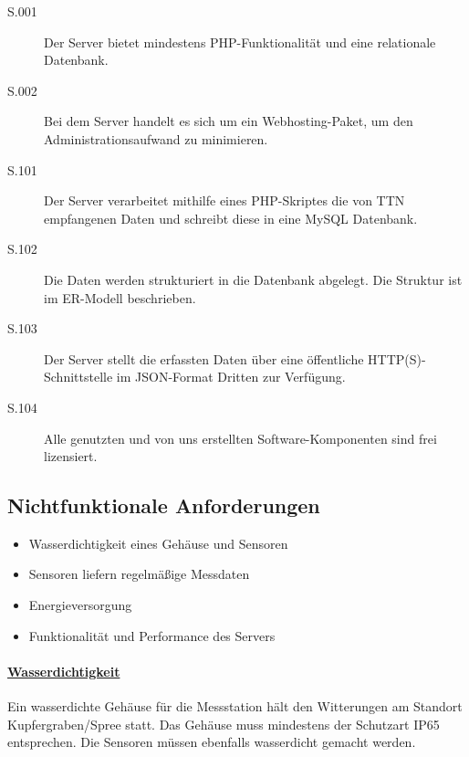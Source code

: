\begin{description}
	\item[S.001]
		Der Server bietet mindestens PHP-Funktionalität und eine relationale Datenbank.

	\item[S.002]
		Bei dem Server handelt es sich um ein Webhosting-Paket, um den
		Administrationsaufwand zu minimieren.
\end{description}

\begin{description}
	\item[S.101]
		Der Server verarbeitet mithilfe eines PHP-Skriptes die von TTN empfangenen
		Daten und schreibt diese in eine MySQL Datenbank.

	\item[S.102]
		Die Daten werden strukturiert in die Datenbank abgelegt. Die Struktur ist im
		ER-Modell beschrieben.

	\item[S.103]
		Der Server stellt die erfassten Daten über eine öffentliche HTTP(S)-Schnittstelle
		im JSON-Format Dritten zur Verfügung.

	\item[S.104]
		Alle genutzten und von uns erstellten Software-Komponenten sind frei lizensiert.
\end{description}


\subsection{Nichtfunktionale Anforderungen}


\begin{itemize}
	\item Wasserdichtigkeit eines Gehäuse und Sensoren
	\item {}Sensoren liefern regelmäßige Messdaten
	\item Energieversorgung
	\item Funktionalität und Performance des Servers
\end{itemize}

\paragraph{\uline{Wasserdichtigkeit}}
Ein wasserdichte Gehäuse für die Messstation hält den Witterungen am Standort Kupfergraben/Spree statt. Das Gehäuse muss mindestens der Schutzart IP65 entsprechen. Die Sensoren müssen ebenfalls wasserdicht gemacht werden.

